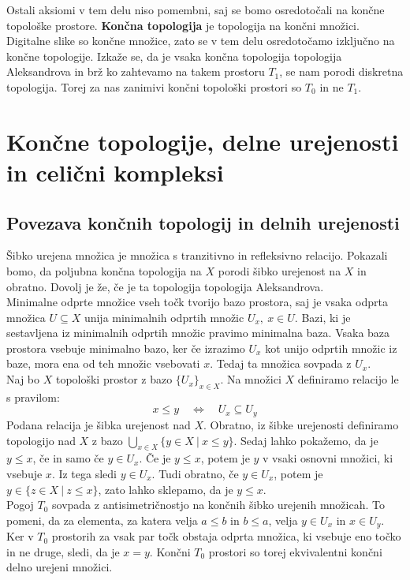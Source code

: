 \documentclass[a4paper, 12pt]{book}
\theoremstyle{definition}
\theoremstyle{remark}
\begin{document}
Ostali aksiomi v tem delu niso pomembni, saj se bomo osredotočali na končne
topološke prostore. \textbf{Končna topologija} je topologija na končni množici. Digitalne slike so
končne množice, zato se v tem delu osredotočamo izključno na končne topologije.
Izkaže se, da je vsaka končna topologija topologija Aleksandrova in brž ko zahtevamo
na takem prostoru $T_1$, se nam porodi diskretna topologija. Torej za nas zanimivi
končni topološki prostori so $T_0$ in ne $T_1$. 

\chapter{Končne topologije, delne urejenosti in celični kompleksi}
\section{Povezava končnih topologij in delnih urejenosti}\label{poset-top}
Šibko urejena množica je množica s tranzitivno in refleksivno relacijo.
Pokazali bomo, da poljubna končna topologija na $X$ porodi šibko urejenost na $X$ in obratno.
Dovolj je že, če je ta topologija topologija Aleksandrova.\\
Minimalne odprte množice vseh točk tvorijo bazo prostora,
saj je vsaka odprta množica $U \subseteq X$ unija minimalnih odprtih množic $U_x,\ x\in U$.
Bazi, ki je sestavljena iz minimalnih odprtih množic pravimo minimalna baza.
Vsaka baza prostora vsebuje minimalno bazo,
ker če izrazimo $U_x$ kot unijo odprtih množic iz baze, mora ena od teh množic
vsebovati $x$. Tedaj ta množica sovpada z $U_x$.\\
Naj bo $X$ topološki prostor z bazo $\{U_x\}_{x \in X}$. Na množici $X$ definiramo
relacijo le s pravilom:
\[x \leq y\quad \Longleftrightarrow\quad U_x \subseteq U_y\]
Podana relacija je šibka urejenost nad $X$. Obratno, iz šibke urejenosti
definiramo topologijo nad $X$ z bazo $\bigcup_{x\in X}\{y \in X\ |\ x \leq y\}$.
Sedaj lahko pokažemo, da je $y \leq x$, če in samo če $y \in U_x$.
Če je $y \leq x$, potem je $y$ v vsaki osnovni množici, ki vsebuje $x$. Iz tega sledi $y \in U_x$.
Tudi obratno, če $y \in U_x$, potem je $y \in \{z \in X\ |\ z \leq x\}$, zato lahko sklepamo, da je $y \leq x$.\\
Pogoj $T_0$ sovpada z antisimetričnostjo na končnih šibko urejenih množicah.
To pomeni, da za elementa, za katera velja $a \leq b$ in $b \leq a$, velja $y \in U_x$ in $x \in U_y$.
Ker v $T_0$ prostorih za vsak par točk obstaja odprta množica,
ki vsebuje eno točko in ne druge, sledi, da je $x = y$. Končni $T_0$ prostori so
torej ekvivalentni končni delno urejeni množici.\\
\end{document}
